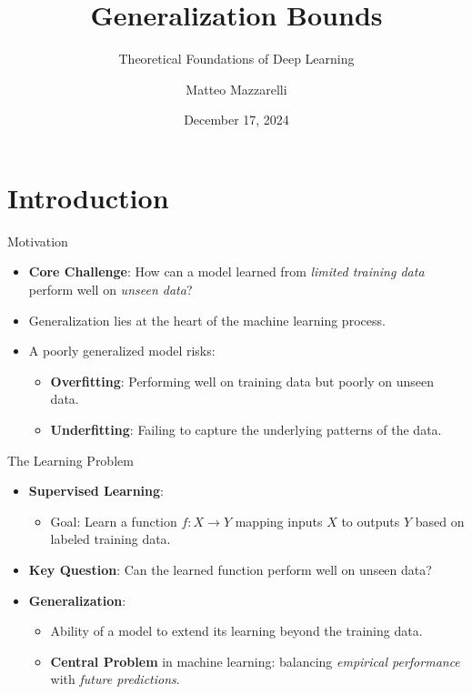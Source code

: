 \documentclass[
  ignorenonframetext,
]{beamer}
\title{Generalization Bounds}
\subtitle{Theoretical Foundations of Deep Learning}
\author{Matteo Mazzarelli}
\date{December 17, 2024}
\providecommand{\tightlist}{%
  \setlength{\itemsep}{0pt}\setlength{\parskip}{0pt}}\usepackage{longtable,booktabs,array}
\begin{document}
\frame{\titlepage}


\section{Introduction}\label{introduction}

\begin{frame}{Motivation}
\label{motivation}
\begin{itemize}
\tightlist
\item
  \textbf{Core Challenge}: How can a model learned from \emph{limited
  training data} perform well on \emph{unseen data}?
\item
  Generalization lies at the heart of the machine learning process.
\item
  A poorly generalized model risks:

  \begin{itemize}
  \tightlist
  \item
    \textbf{Overfitting}: Performing well on training data but poorly on
    unseen data.
  \item
    \textbf{Underfitting}: Failing to capture the underlying patterns of
    the data.
  \end{itemize}
\end{itemize}
\end{frame}

\begin{frame}{The Learning Problem}
\label{the-learning-problem}
\begin{itemize}
\tightlist
\item
  \textbf{Supervised Learning}:

  \begin{itemize}
  \tightlist
  \item
    Goal: Learn a function \(f: X \to Y\) mapping inputs \(X\) to
    outputs \(Y\) based on labeled training data.
  \end{itemize}
\item
  \textbf{Key Question}: Can the learned function perform well on unseen
  data?
\item
  \textbf{Generalization}:

  \begin{itemize}
  \tightlist
  \item
    Ability of a model to extend its learning beyond the training data.
  \item
    \textbf{Central Problem} in machine learning: balancing
    \emph{empirical performance} with \emph{future predictions}.
  \end{itemize}
\end{itemize}
\end{frame}
\end{document}
